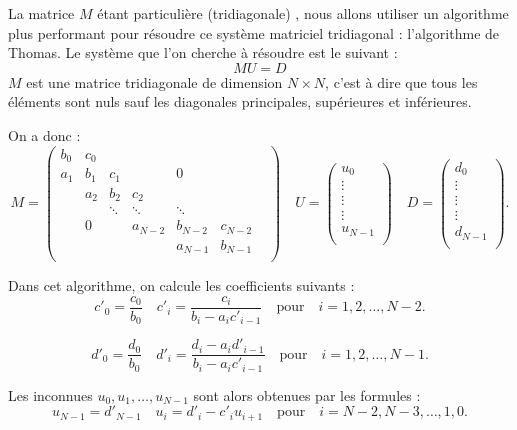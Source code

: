 \documentclass[10pt,fleqn]{article} %
\begin{document}
\begin{multicols}{2}
\begin{multicols}{2}
\ifprof
\else

\begin{obj}
La matrice $M$ étant particulière (tridiagonale) , nous allons utiliser un algorithme plus 
performant pour résoudre ce système matriciel tridiagonal : l'algorithme de Thomas.
 Le système que l'on cherche à résoudre est le suivant : 
$$
M U = D 
$$
$M$ est une matrice tridiagonale de dimension $N\times N$, c'est à dire que tous les éléments 
sont nuls sauf les diagonales principales, supérieures et inférieures. 
\end{obj}

On a donc : 
$$
M = 
\begin{pmatrix}
b_0 & c_0 &  &  &  &  & \\
a_1 & b_1 & c_1 & &0 & &\\
      & a_2 & b_2 & c_2 & & & \\
& & \ddots & \ddots & \ddots & \\
& 0& & a_{N-2} & b_{N-2} & c_{N-2}\\
& & & & a_{N-1} & b_{N-1}\\
\end{pmatrix}
\quad 
U = \begin{pmatrix}
u_0 \\
\vdots \\
\vdots \\
\vdots  \\
u_{N-1} \\
\end{pmatrix}
\quad 
D = \begin{pmatrix}
d_0 \\
\vdots \\
\vdots \\
\vdots  \\
d_{N-1} \\
\end{pmatrix}.
$$

Dans cet algorithme, on calcule les coefficients suivants : 
$$
c'_0 = \dfrac{c_0}{b_0} \quad c'_i = \dfrac{c_i}{b_i - a_i c'_{i-1}}  \quad \text{pour} \quad i=1,2,\ldots, N-2.$$

$$
d'_0 = \dfrac{d_0}{b_0} \quad d'_i = \dfrac{d_i-a_i d'_{i-1}}{b_i - a_i c'_{i-1}}  \quad \text{pour} \quad i=1,2,\ldots, N-1.
$$

Les inconnues $u_0, u_1, \ldots, u_{N-1}$ sont alors obtenues par les formules :
$$
u_{N-1} = d'_{N-1} \quad u_i = d'_i -c'_i u_{i+1} \quad  \text{pour} \quad i=N-2, N-3, \ldots, 1, 0.
$$

\fi


\end{multicols}
\end{multicols}
\end{document}
